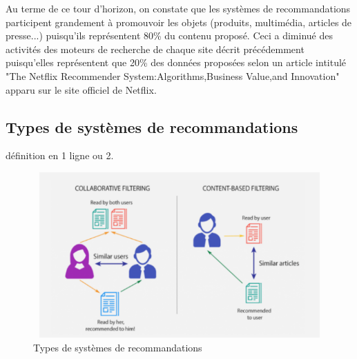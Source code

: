         Au terme de ce tour d'horizon, on constate que les systèmes de recommandations participent grandement à promouvoir les objets (produits, multimédia, articles de presse...) puisqu'ils représentent 80\% du contenu proposé. Ceci a diminué des activités des moteurs de recherche de chaque site décrit précédemment puisqu'elles représentent que 20\% des données proposées selon un article intitulé "The Netflix Recommender System:Algorithms,Business Value,and Innovation" apparu sur le site officiel de Netflix. \cite{netflix}\\

    \subsection{Types de systèmes de recommandations}
    définition en 1 ligne ou 2.
    \begin{figure}[H]
            \centering
               \includegraphics[height=180pt,width=350pt]{img/chapter1/filtering.png}
            \caption{Types de systèmes de recommandations\cite{figfiltering}}

    \end{figure}

